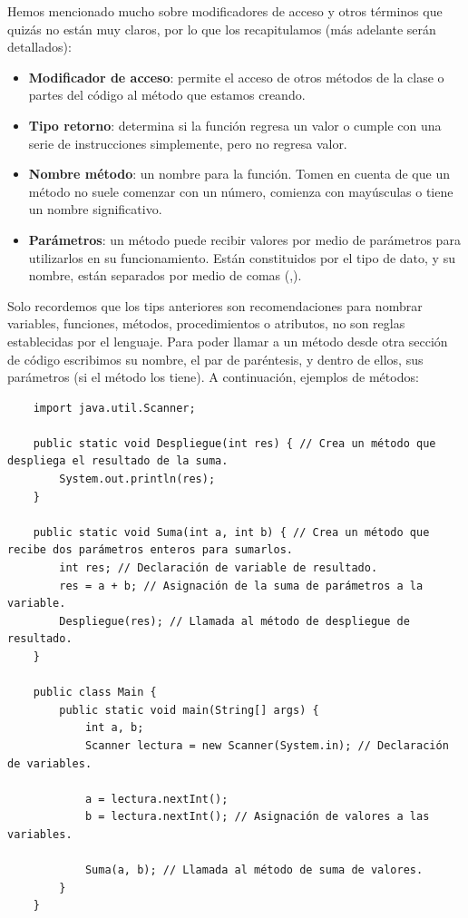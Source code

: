 Hemos mencionado mucho sobre modificadores de acceso y otros términos que quizás no están muy claros, por lo que los recapitulamos (más adelante serán detallados):
\begin{itemize}
    \item \textbf{Modificador de acceso}: permite el acceso de otros métodos de la clase o partes del código al método que estamos creando.
    \item \textbf{Tipo retorno}: determina si la función regresa un valor o cumple con una serie de instrucciones simplemente, pero no regresa valor.
    \item \textbf{Nombre método}: un nombre para la función. Tomen en cuenta de que un método no suele comenzar con un número, comienza con mayúsculas o tiene un nombre significativo.
    \item \textbf{Parámetros}: un método puede recibir valores por medio de parámetros para utilizarlos en su funcionamiento. Están constituidos por el tipo de dato, y su nombre, están separados por medio de comas (,).
\end{itemize}

Solo recordemos que los tips anteriores son recomendaciones para nombrar variables, funciones, métodos, procedimientos o atributos, no son reglas establecidas por el lenguaje. Para poder llamar a un método desde otra sección de código escribimos su nombre, el par de paréntesis, y dentro de ellos, sus parámetros (si el método los tiene). A continuación, ejemplos de métodos:
\begin{lstlisting}
    import java.util.Scanner;
    
    public static void Despliegue(int res) { // Crea un método que despliega el resultado de la suma.
        System.out.println(res);
    }
    
    public static void Suma(int a, int b) { // Crea un método que recibe dos parámetros enteros para sumarlos.
        int res; // Declaración de variable de resultado.
        res = a + b; // Asignación de la suma de parámetros a la variable.
        Despliegue(res); // Llamada al método de despliegue de resultado.
    }
    
    public class Main {
        public static void main(String[] args) {
            int a, b;
            Scanner lectura = new Scanner(System.in); // Declaración de variables.
            
            a = lectura.nextInt();
            b = lectura.nextInt(); // Asignación de valores a las variables.
            
            Suma(a, b); // Llamada al método de suma de valores.
        }
    }
\end{lstlisting}

